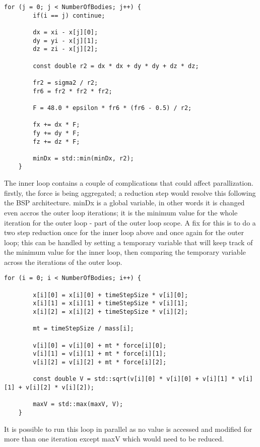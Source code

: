 \documentclass[11pt]{article}
\begin{document}
    \begin{lstlisting}[style=CStyle]
    for (j = 0; j < NumberOfBodies; j++) {
        if(i == j) continue;

        dx = xi - x[j][0];
        dy = yi - x[j][1];
        dz = zi - x[j][2];

        const double r2 = dx * dx + dy * dy + dz * dz;

        fr2 = sigma2 / r2;
        fr6 = fr2 * fr2 * fr2;

        F = 48.0 * epsilon * fr6 * (fr6 - 0.5) / r2;

        fx += dx * F;
        fy += dy * F;
        fz += dz * F;

        minDx = std::min(minDx, r2);
    }
    \end{lstlisting}
    The inner loop contains a couple of complications that could affect parallization. firstly, the force is being aggregated; a reduction step would resolve this following the BSP architecture. minDx is a global variable, in other words it is changed even accros the outer loop iterations; it is the minimum value for the whole iteration for the outer loop - part of the outer loop scope. A fix for this is to do a two step reduction once for the inner loop above and once again for the outer loop; this can be handled by setting a temporary variable that will keep track of the minimum value for the inner loop, then comparing the temporary variable across the iterations of the outer loop. 
    
    \begin{lstlisting}[style=CStyle]
    for (i = 0; i < NumberOfBodies; i++) {

        x[i][0] = x[i][0] + timeStepSize * v[i][0];
        x[i][1] = x[i][1] + timeStepSize * v[i][1];
        x[i][2] = x[i][2] + timeStepSize * v[i][2];

        mt = timeStepSize / mass[i];

        v[i][0] = v[i][0] + mt * force[i][0];
        v[i][1] = v[i][1] + mt * force[i][1];
        v[i][2] = v[i][2] + mt * force[i][2];

        const double V = std::sqrt(v[i][0] * v[i][0] + v[i][1] * v[i][1] + v[i][2] * v[i][2]);

        maxV = std::max(maxV, V);
    }
    \end{lstlisting}
    It is possible to run this loop in parallel as no value is accessed and modified for more than one iteration except maxV which would need to be reduced. 
\end{document}
